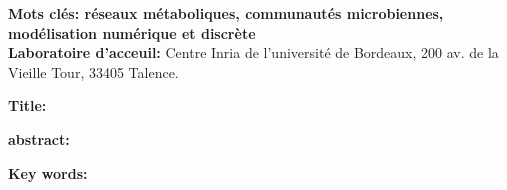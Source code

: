 \documentclass[../main.tex]{subfiles}
\begin{document}
%


\textbf{Mots clés: réseaux métaboliques, communautés microbiennes, modélisation numérique et discrète} \\

\textbf{Laboratoire d'acceuil:} Centre Inria de l'université de Bordeaux, 200 av. de la Vieille Tour, 33405 Talence.  

\newpage

\textbf{Title:}

\textbf{abstract:}





\textbf{Key words:}
\end{document}

